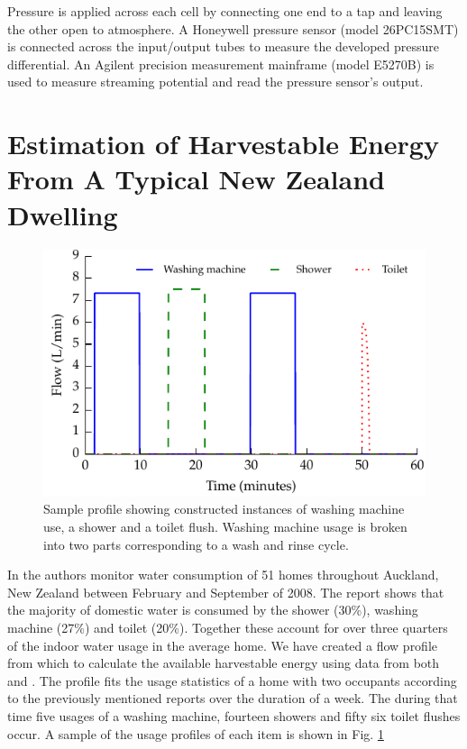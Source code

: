\documentclass[10pt,final,journal]{IEEEtran}
\begin{document}
    Pressure is applied across each cell by connecting one end to a tap and leaving the other open to atmosphere.
    A Honeywell pressure sensor (model 26PC15SMT) is connected across the input/output tubes to measure the developed pressure differential.
    An Agilent precision measurement mainframe (model E5270B) is used to measure streaming potential and read the pressure sensor's output.


    \section{Estimation of Harvestable Energy From A Typical New Zealand Dwelling}
    \label{sect:waterConsumption}
    \begin{figure}
        \begin{center}
        \includegraphics[width=\linewidth]{graph_profile.pdf}
        \end{center}
        \caption{Sample profile showing constructed instances of washing machine use, a shower and a toilet flush.
        Washing machine usage is broken into two parts corresponding to a wash and rinse cycle.}
        \label{fig:profileSample}
    \end{figure}

    In \cite{Heinrich2008} the authors monitor water consumption of 51 homes throughout Auckland, New Zealand between February and September of 2008.
    The report shows that the majority of domestic water is consumed by the shower (30\%), washing machine (27\%) and toilet (20\%).
    Together these account for over three quarters of the indoor water usage in the average home.
    We have created a flow profile from which to calculate the available harvestable energy using data from both \cite{Heinrich2008} and \cite{Heinrich2007}.
    The profile fits the usage statistics of a home with two occupants according to the previously mentioned reports over the duration of a week.
    The during that time five usages of a washing machine, fourteen showers and fifty six toilet flushes occur.
    A sample of the usage profiles of each item is shown in Fig. \ref{fig:profileSample}
\end{document}
